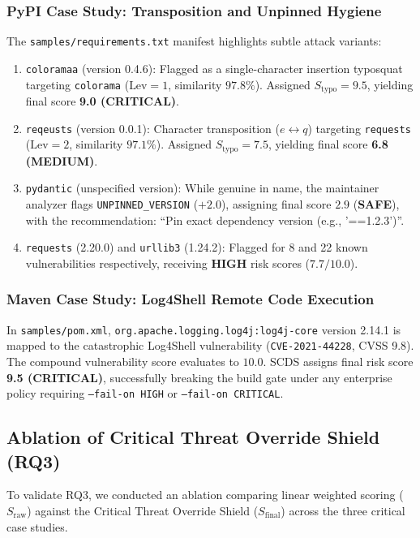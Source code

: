 \subsubsection{PyPI Case Study: Transposition and Unpinned Hygiene}
The \texttt{samples/requirements.txt} manifest highlights subtle attack variants:
\begin{enumerate}
    \item \texttt{coloramaa} (version 0.4.6): Flagged as a single-character insertion typosquat targeting \texttt{colorama} ($\text{Lev} = 1$, similarity $97.8\%$). Assigned $S_{\text{typo}} = 9.5$, yielding final score \textbf{9.0 (CRITICAL)}.
    \item \texttt{reqeusts} (version 0.0.1): Character transposition ($e \leftrightarrow q$) targeting \texttt{requests} ($\text{Lev} = 2$, similarity $97.1\%$). Assigned $S_{\text{typo}} = 7.5$, yielding final score \textbf{6.8 (MEDIUM)}.
    \item \texttt{pydantic} (unspecified version): While genuine in name, the maintainer analyzer flags \texttt{UNPINNED\_VERSION} ($+2.0$), assigning final score $2.9$ (\textbf{SAFE}), with the recommendation: ``Pin exact dependency version (e.g., '==1.2.3')''.
    \item \texttt{requests} (2.20.0) and \texttt{urllib3} (1.24.2): Flagged for 8 and 22 known vulnerabilities respectively, receiving \textbf{HIGH} risk scores ($7.7/10.0$).
\end{enumerate}

\subsubsection{Maven Case Study: Log4Shell Remote Code Execution}
In \texttt{samples/pom.xml}, \texttt{org.apache.logging.log4j:log4j-core} version 2.14.1 is mapped to the catastrophic Log4Shell vulnerability (\texttt{CVE-2021-44228}, CVSS 9.8). The compound vulnerability score evaluates to $10.0$. SCDS assigns final risk score \textbf{9.5 (CRITICAL)}, successfully breaking the build gate under any enterprise policy requiring \texttt{--fail-on HIGH} or \texttt{--fail-on CRITICAL}.

\subsection{Ablation of Critical Threat Override Shield (RQ3)}
To validate RQ3, we conducted an ablation comparing linear weighted scoring ($S_{\text{raw}}$) against the Critical Threat Override Shield ($S_{\text{final}}$) across the three critical case studies.


